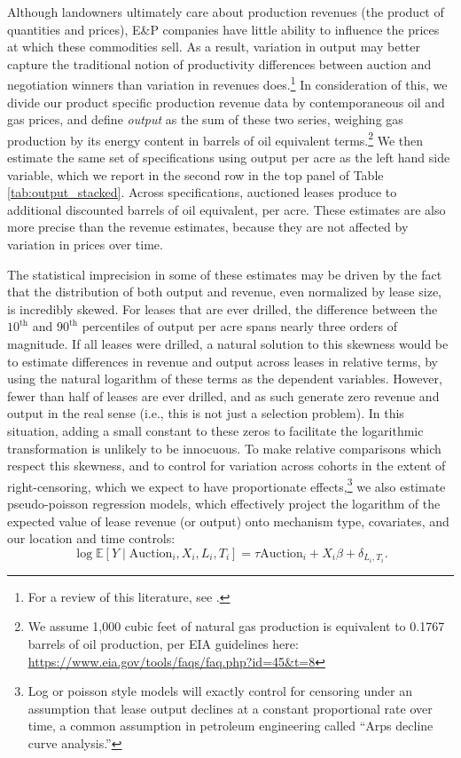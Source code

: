 \documentclass[12pt]{article}
\newcommand{\inputy}[1]{\unskip}
\begin{document}
Although landowners ultimately care about production revenues (the product of quantities and prices), E\&P companies have little ability to influence the prices at which these commodities sell.  As a result, variation in output may better capture the traditional notion of productivity differences between auction and negotiation winners than variation in revenues does.\footnote{For a review of this literature, see \cite{syverson2011determines}.}  In consideration of this, we divide our product specific production revenue data by contemporaneous oil and gas prices, and define \textit{output} as the sum of these two series, weighing gas production by its energy content in barrels of oil equivalent terms.\footnote{We assume 1,000 cubic feet of natural gas production is equivalent to 0.1767 barrels of oil production, per EIA guidelines here: \url{https://www.eia.gov/tools/faqs/faq.php?id=45&t=8}}  We then estimate the same set of specifications using output per acre as the left hand side variable, which we report in the second row in the top panel of Table \ref{tab:output_stacked}. Across specifications, auctioned leases produce \inputy{../output/estimates/dboe_min.tex} to \inputy{../output/estimates/dboe_max.tex} additional discounted barrels of oil equivalent, per acre. These estimates are also more precise than the revenue estimates, because they are not affected by variation in prices over time. 

The statistical imprecision in some of these estimates may be driven by the fact that the distribution of both output and revenue, even normalized by lease size, is incredibly skewed. For leases that are ever drilled, the difference between the $10^{\text{th}}$ and $90^{\text{th}}$ percentiles of output per acre spans nearly three orders of magnitude. If all leases were drilled, a natural solution to this skewness would be to estimate differences in revenue and output across leases in relative terms, by using the natural logarithm of these terms as the dependent variables. However, fewer than half of leases are ever drilled, and as such generate zero revenue and output in the real sense (i.e., this is not just a selection problem).  In this situation, adding a small constant to these zeros to facilitate the logarithmic transformation is unlikely to be innocuous.  To make relative comparisons which respect this skewness, and to control for variation across cohorts in the extent of right-censoring, which we expect to have proportionate effects,\footnote{Log or poisson style models will exactly control for censoring under an assumption that lease output declines at a constant proportional rate over time, a common assumption in petroleum engineering called ``Arps decline curve analysis.''} we also estimate pseudo-poisson regression models, which effectively project the logarithm of the expected value of lease revenue (or output) onto mechanism type, covariates, and our location and time controls:
\begin{equation*}
 	\log \mathbb{E}\left[Y\mid \text{Auction}_i, X_i, L_i, T_i\right] = \tau \text{Auction}_i + X_i \beta + \delta_{L_i,T_i}. \label{eq:mainAuctionPoisson}
\end{equation*} 
\end{document}
